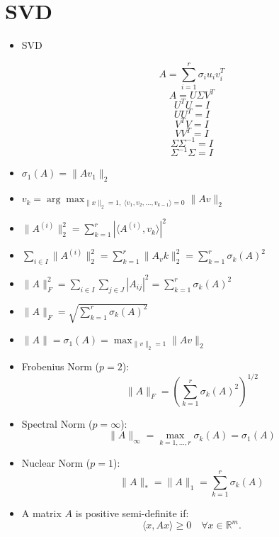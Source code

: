 \documentclass{article}
\begin{document}
\section{SVD}

\begin{itemize}

\item SVD

\[
A = \sum_{i=1}^r \sigma_i u_i v_i^T
\]
\[
A = U \Sigma V^T
\]
\[
U^T U = I
\]
\[
U U^T = I
\]
\[
V^T V = I
\]
\[
V V^T = I
\]
\[
\Sigma \Sigma^{-1} = I
\]
\[
\Sigma^{-1} \Sigma = I
\]

\item 
$
\sigma_1(A) = \|Av_1\|_2
$


\item 
$
v_k = \arg \max_{\|x\|_2=1,\; \langle v_1,v_2,\ldots,v_{k-1} \rangle=0} \|Av\|_2
$

\item    $
    \| A^{(i)} \|_2^2 = \sum_{k=1}^{r} | \langle A^{(i)}, v_k \rangle |^2
    $

\item 
$
    \sum_{i \in I} \| A^{(i)} \|_2^2 = \sum_{k=1}^{r} \| A_v k \|_2^2 = \sum_{k=1}^{r} \sigma_k(A)^2
$

\item
   $
    \| A \|_F^2 = \sum_{i \in I} \sum_{j \in J} | A_{ij} |^2 = \sum_{k=1}^{r} \sigma_k(A)^2
  $

\item 
    $
    \| A \|_F = \sqrt{ \sum_{k=1}^{r} \sigma_k(A)^2 }
   $

\item 
$
\|A\| = \sigma_1(A) = \max_{\|v\|_2=1} \|Av\|_2
$

\item Frobenius Norm ($p = 2$):
        \[
        \|A\|_F = \left( \sum_{k=1}^r \sigma_k(A)^2 \right)^{1/2}
        \]

        \item Spectral Norm ($p = \infty$):
        \[
        \|A\|_\infty = \max_{k=1,\ldots,r} \sigma_k(A) = \sigma_1(A)
        \]

        \item Nuclear Norm ($p = 1$):
        \[
        \|A\|_* = \|A\|_1 = \sum_{k=1}^r \sigma_k(A)
        \]

\item A matrix $A$ is positive semi-definite if:
        \[
        \langle x, Ax \rangle \geq 0 \quad \forall x \in \mathbb{R}^m.
        \]


\end{itemize}
\end{document}
